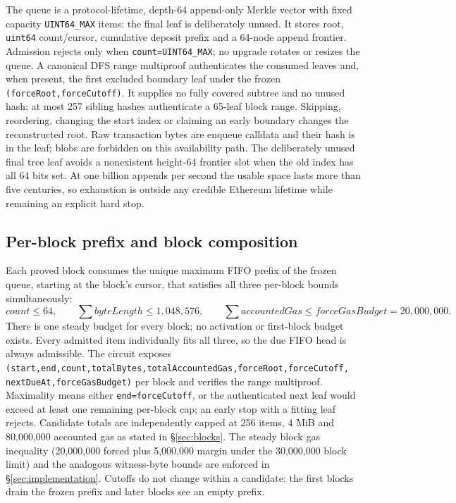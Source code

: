 \documentclass[a4paper,11pt]{article}
\newcommand{\code}[1]{\nolinkurl{#1}}
\begin{document}
The queue is a protocol-lifetime, depth-64 append-only Merkle vector with
fixed capacity \code{UINT64_MAX} items: the final leaf is deliberately
unused.  It stores root, \code{uint64} count/cursor, cumulative deposit
prefix and a 64-node append frontier.  Admission rejects only when
\code{count=UINT64_MAX}; no upgrade rotates or resizes the queue.  A
canonical DFS range multiproof authenticates the consumed leaves and, when
present, the first excluded boundary leaf under the frozen
\code{(forceRoot,forceCutoff)}.  It supplies no fully covered subtree and no
unused hash; at most 257 sibling hashes authenticate a 65-leaf block range.
Skipping, reordering, changing the start index or claiming an early boundary
changes the reconstructed root.  Raw transaction bytes are enqueue calldata
and their hash is in the leaf; blobs are forbidden on this availability
path.  The deliberately unused final tree leaf avoids a nonexistent
height-64 frontier slot when the old index has all 64 bits set.  At one
billion appends per second the usable space lasts more than five centuries,
so exhaustion is outside any credible Ethereum lifetime while remaining an
explicit hard stop.

\subsection{Per-block prefix and block composition}\label{sec:forced-prefix}

Each proved block consumes the unique maximum FIFO prefix of the frozen
queue, starting at the block's cursor, that satisfies all three per-block
bounds simultaneously:
\[
count\le64,\qquad \sum byteLength\le1{,}048{,}576,\qquad
\sum accountedGas\le forceGasBudget=20{,}000{,}000 .
\]
There is one steady budget for every block; no activation or first-block
budget exists.  Every admitted item individually fits all three, so the due
FIFO head is always admissible.  The circuit exposes
\code{(start,end,count,totalBytes,totalAccountedGas,forceRoot,forceCutoff,
nextDueAt,forceGasBudget)} per block and verifies the range multiproof.
Maximality means either \code{end=forceCutoff}, or the authenticated next
leaf would exceed at least one remaining per-block cap; an early stop with a
fitting leaf rejects.  Candidate totals are independently capped at 256
items, 4 MiB and 80,000,000 accounted gas as stated in \S\ref{sec:blocks}.
The steady block gas inequality (20,000,000 forced plus 5,000,000 margin
under the 30,000,000 block limit) and the analogous witness-byte bounds are
enforced in \S\ref{sec:implementation}.  Cutoffs do not change within a
candidate: the first blocks drain the frozen prefix and later blocks see an
empty prefix.
\end{document}
